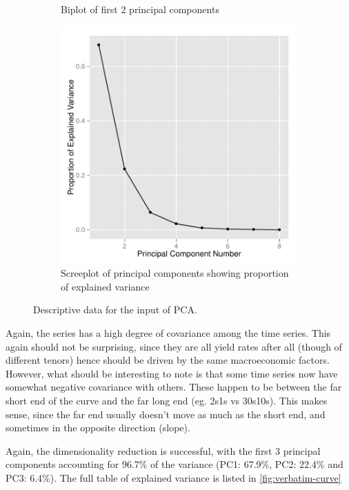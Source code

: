 \documentclass[11pt]{scrreprt}
\begin{document}
\begin{figure}[H]
\begin{subfigure}{.3\textwidth}
\caption{Biplot of first 2 principal components}
\end{subfigure}
\begin{subfigure}{.3\textwidth}
\centering\includegraphics[]{screeplot-curve-returns.pdf}
\caption{Screeplot of principal components showing proportion of explained variance}
\end{subfigure}
\caption{Descriptive data for the input of PCA.}
\label{fig:descriptive-pca-curve}
\end{figure}

Again, the series has a high degree of covariance among the time series. This again should not be surprising, since they are all yield rates after all (though of different tenors) hence should be driven by the same macroeconomic factors. However, what should be interesting to note is that some time series now have somewhat negative covariance with others. These happen to be between the far short end of the curve and the far long end (eg. 2s1s vs 30s10s). This makes sense, since the far end usually doesn't move as much as the short end, and sometimes in the opposite direction (slope).

Again, the dimensionality reduction is successful, with the first 3 principal components accounting for 96.7\% of the variance (PC1: 67.9\%, PC2: 22.4\% and PC3: 6.4\%). The full table of explained variance is listed in \ref{fig:verbatim-curve}
\end{document}
